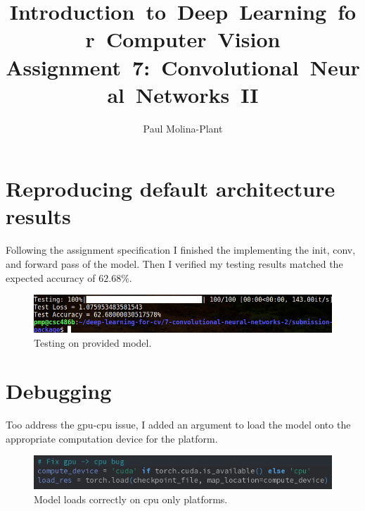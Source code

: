 \documentclass[12pt, letter]{article}
\newcommand{\courseName}{Introduction~to~Deep~Learning~for~Computer~Vision}
\newcommand{\assignName}{Assignment~7:~Convolutional~Neural~Networks~II}
\begin{document}
\pagestyle{titlesec_assignment}

\title{\courseName\\\assignName}
\author{Paul Molina-Plant}

\maketitle


\section{Reproducing default architecture results}

Following the assignment specification I finished the implementing the init,
conv, and forward pass of the model. Then I verified my testing results matched the expected accuracy of $62.68\%$.
\begin{figure}[!ht]
  \centering
  \includegraphics[width=0.8 \textwidth]{test.png}
  \caption{Testing on provided model.}
  \label{fig:test}
\end{figure}

\section{Debugging}
Too address the gpu-cpu issue, I added an argument to load the model onto the
appropriate computation device for the platform.
\begin{figure}[!ht]
  \centering
  \includegraphics[width=0.8 \textwidth]{cpufix.png}
  \caption{Model loads correctly on cpu only platforms.}
  \label{fig:eg}
\end{figure}

\newpage
\end{document}
